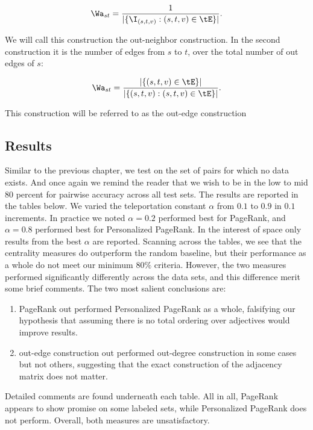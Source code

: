 \begin{equation}
	\Wa_{st} = \frac{1}{|\{ \I_{(s,t,v)} : (s,t,v) \in \tE \}|}.
\end{equation}

We will call this construction the out-neighbor construction. In the second construction it is the number of edges from $s$ to $t$, over the total number of out edges of $s$:

\begin{equation}
	\Wa_{st} = \frac{|\{ (s,t,v) \in \tE \}|}{|\{ (s,t,v) : (s,t,v) \in \tE \}|}.
\end{equation}

This construction will be referred to as the out-edge construction

\subsection{Results}

Similar to the previous chapter, we test on the set of pairs for which no data exists. And once again we remind the reader that we wish to be in the low to mid 80 percent for pairwise accuracy across all test sets. The results are reported in the tables below. We varied the teleportation constant $\alpha$ from $0.1$ to $0.9$ in $0.1$ increments. In practice we noted $\alpha = 0.2$ performed best for PageRank, and $\alpha = 0.8$ performed best for Personalized PageRank. In the interest of space only results from the best $\alpha$ are reported. Scanning across the tables, we see that the centrality measures do outperform the random baseline, but their performance as a whole do not meet our minimum $80\%$ criteria. However, the two measures performed significantly differently across the data sets, and this difference merit some brief comments. The two most salient conclusions are:

\begin{enumerate}
	\item PageRank out performed Personalized PageRank as a whole, falsifying our hypothesis that assuming there is no total ordering over adjectives would improve results.
	\item out-edge construction out performed out-degree construction in some cases but not others, suggesting that the exact construction of the adjacency matrix does not matter. 	 
\end{enumerate}

Detailed comments are found underneath each table. All in all, PageRank appears to show promise on some labeled sets, while Personalized PageRank does not perform. Overall, both measures are unsatisfactory. 




